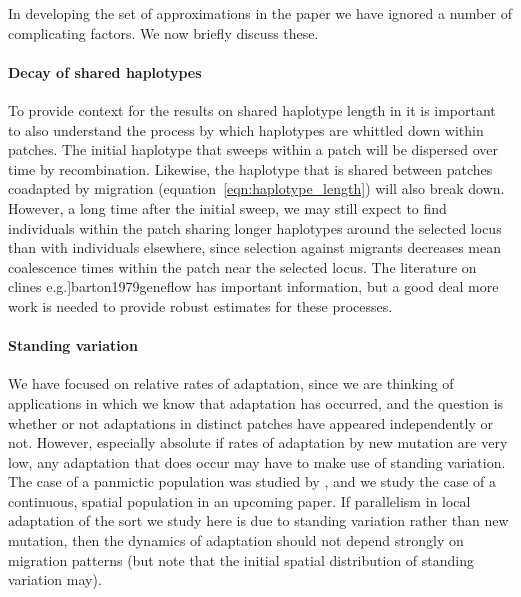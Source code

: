 \documentclass{article}
\newcommand{\citep}[1]{\cite{#1}}
\newcommand{\citet}[1]{\cite{#1}}
\begin{document}
In developing the set of approximations in the paper we have ignored a
number of complicating factors. We now briefly discuss these.

\paragraph{Decay of shared haplotypes} 
To provide context for the results on shared haplotype length in 
it is important to also understand
the process by which haplotypes are whittled down within patches.
The initial haplotype that sweeps within a patch 
will be dispersed over time by recombination.
Likewise, the haplotype that is shared between patches coadapted by migration
(equation~\ref{eqn:haplotype_length}) will also break down. 
However, a long time after the initial sweep,
we may still expect to find individuals within the patch sharing longer haplotypes around the selected locus
than with individuals elsewhere,
since selection against migrants 
decreases mean coalescence times within the patch near the selected locus.  %
The literature on clines \citep[e.g.]{barton1979geneflow} has important information,
but a good deal more work is needed
to provide robust estimates for these processes.

\paragraph{Standing variation} 
We have focused on relative rates of adaptation,
since we are thinking of applications in which we know that adaptation has occurred,
and the question is whether or not adaptations in distinct patches
have appeared independently or not.
However, especially absolute if rates of adaptation by new mutation are very low,
any adaptation that does occur may have to make use of standing variation.
The case of a panmictic population was studied by \citet{softsweepsI},
and we study the case of a continuous, spatial population in an upcoming paper.
If parallelism in local adaptation of the sort we study here is due to standing variation
rather than new mutation,
then the dynamics of adaptation should not depend strongly on migration patterns
(but note that the initial spatial distribution of standing variation may).
\end{document}
